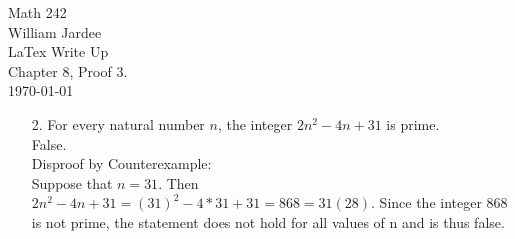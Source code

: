 \documentclass[10pt] {report}
\begin{document}
\begin{center}
Math 242\\
William Jardee\\
LaTex Write Up\\
Chapter 8, Proof 3.\\
\today\\

\end{center}
\begin{enumerate}
\item[2.] For every natural number $n$, the integer $2n^2 -4n+31$ is prime.\\
False.\\
Disproof by Counterexample:\\
Suppose that $n=31$.  Then $2n^2 -4n+31=(31)^2 -4*31 +31= 868=31(28)$. Since the integer 868 is not prime, the statement does not hold for all values of n and is thus false. 


\end{enumerate}
\end{document}
